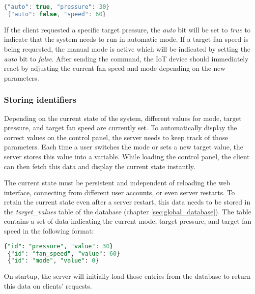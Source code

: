 \begin{lstlisting}[language = Java, numbers = none]
 {"auto": true, "pressure": 30}
 {"auto": false, "speed": 60}
\end{lstlisting}

If the client requested a specific target pressure, the \textit{auto} bit will be set to \textit{true} to indicate that the system needs to run in automatic mode. If a target fan speed is being requested, the manual mode is active which will be indicated by setting the \textit{auto} bit to \textit{false}. After sending the command, the IoT device should immediately react by adjusting the current fan speed and mode depending on the new parameters.



\subsubsection{Storing identifiers}
\label{subsec:storing_identifiers}

Depending on the current state of the system, different values for mode, target pressure, and target fan speed are currently set. To automatically display the correct values on the control panel, the server needs to keep track of those parameters. Each time a user switches the mode or sets a new target value, the server stores this value into a variable. While loading the control panel, the client can then fetch this data and display the current state instantly.

The current state must be persistent and independent of reloading the web interface, connecting from different user accounts, or even server restarts. To retain the current state even after a server restart, this data needs to be stored in the \textit{target\_values} table of the database (chapter \ref{sec:global_database}). The table contains a set of data indicating the current mode, target pressure, and target fan speed in the following format:

\begin{lstlisting}[language = SQL, numbers = none]
 {"id": "pressure", "value": 30}
 {"id": "fan_speed", "value": 60}
 {"id": "mode", "value": 0}
\end{lstlisting}

On startup, the server will initially load those entries from the database to return this data on clients' requests.